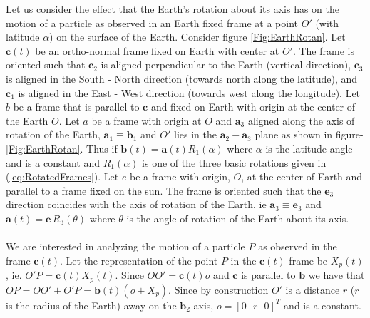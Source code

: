\documentclass[graybox,envcountchap,sectrefs]{svmonoMuga}
\begin{document}
Let us consider the effect that the Earth's rotation about its axis has on the motion of a particle as observed in an Earth fixed frame at a point $O'$ (with latitude $\alpha$) on the 
surface of the Earth. Consider figure \ref{Fig:EarthRotan}. Let $\mathbf{c}(t)$ be an ortho-normal frame fixed on Earth with center at $O'$. The frame is oriented such that $\mathbf{c}_2$ is aligned 
perpendicular to the Earth (vertical direction), $\mathbf{c}_3$ is aligned in the South - North direction (towards north along the latitude), and $\mathbf{c}_1$ is aligned in the East - West direction 
(towards west along the longitude). Let $b$ be a frame that is parallel to $\mathbf{c}$ and fixed on Earth with origin at the center of the Earth $O$. Let $a$ be a frame with origin at $O$ and 
$\mathbf{a}_3$ aligned along the axis of rotation of the Earth, $\mathbf{a}_1 \equiv \mathbf{b}_1$ and $O'$ lies in the $\mathbf{a}_2 - \mathbf{a}_3$ plane as shown in figure-\ref{Fig:EarthRotan}.
Thus if $\mathbf{b}(t)=\mathbf{a}(t)R_1(\alpha)$
where $\alpha$ is the latitude angle and is a constant and $R_1(\alpha)$ is one of the three basic rotations given in (\ref{eq:RotatedFrames}).
Let $e$ be a frame with origin, $O$, at the center of Earth and parallel to a frame fixed on the sun. The frame is oriented such that the $\mathbf{e}_3$ direction coincides with the axis of 
rotation of the Earth, ie $\mathbf{a}_3\equiv \mathbf{e}_3$ and $\mathbf{a}(t)=\mathbf{e}\,R_3(\theta)$ where $\theta$ is the angle of rotation of the Earth about its axis.
\\
\\
We are interested in analyzing the motion of a particle $P$ as observed in the frame $\mathbf{c}(t)$. Let the representation of the point $P$ in the $\mathbf{c}(t)$ frame be $X_p(t)$, ie. $O'P=\mathbf{c}(t)X_p(t)
$. Since $OO'=\mathbf{c}(t)o$ and $\mathbf{c}$ is parallel to $\mathbf{b}$ we have that $OP=OO'+O'P=\mathbf{b}(t)(o+X_p)$.  Since by construction $O'$ is a distance $r$ ($r$ is the radius of the Earth) away on the 
$\mathbf{b}_2$ axis, $o=[0\:\:\:r\:\:\:0]^T$ and is a constant.
\end{document}
